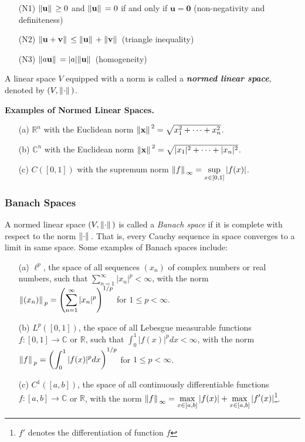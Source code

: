 \documentclass[12pt, a4paper]{article} %
\begin{document}
\begin{itemize}
\item[(N1)] $\norm*{\mathbf{u}}\geq 0$ and $\norm*{\mathbf{u}}=0$ if and only if $\mathbf{u}=\mathbf{0}$ (non-negativity and definiteness)
\item[(N2)] $\norm*{\mathbf{u}+\mathbf{v}}\leq \norm*{\mathbf{u}}+\norm*{\mathbf{v}}$ (triangle inequality)
\item[(N3)] $\norm*{a\mathbf{u}}=|a|\norm*{\mathbf{u}}$ (homogeneity)
\end{itemize}

A linear space $V$ equipped with a norm is called a \textit{\bf normed linear space}, denoted by $(V,\norm*{\cdot})$.


\textbf{Examples of Normed Linear Spaces.}

\begin{itemize}
\item[(a)] $\mathbb{R}^n$ with the Euclidean norm $\norm*{\mathbf{x}}^2 = \sqrt{x_1^2+\cdots+x_n^2}$.
\item[(b)] $\mathbb{C}^n$ with the Euclidean norm $\norm*{\mathbf{x}}^2 = \sqrt{|x_1|^2+\cdots+|x_n|^2}$.
\item[(c)] $C([0,1])$ with the supremum norm $\norm*{f}_{\infty} = \displaystyle \sup_{x\in[0,1]}|f(x)|$.
\end{itemize}

\subsubsection{Banach Spaces}
A normed linear space $(V,\norm*{\cdot})$ is called a \textit{Banach space} if it is complete with respect to the norm $\norm*{\cdot}$. That is, every Cauchy sequence in space converges to a limit in same space. Some examples of Banach spaces include:

\pagebreak

\vspace*{0.2cm}
\begin{itemize}
\item[(a)] $\ell^p$, the space of all sequences $(x_n)$ of complex numbers or real numbers, such that $\displaystyle \sum_{n=1}^{\infty}|x_n|^p<\infty$, with the norm $\norm*{(x_n)}_p = \left(\displaystyle \sum_{n=1}^{\infty}|x_n|^p \right)^{1/p}$ for $1\leq p<\infty$.
\item[(b)] $L^p([0,1])$, the space of all Lebesgue measurable functions $f:[0,1]\rightarrow \mathbb{C}$ or $\mathbb{R}$, such that $\displaystyle \int_0^1|f(x)|^p dx<\infty$, with the norm $\norm*{f}_p = \left(\displaystyle \int_0^1|f(x)|^p dx \right)^{1/p}$ for $1\leq p<\infty$.
\item[(c)] $C^1([a,b])$, the space of all continuously differentiable functions $f:[a,b]\rightarrow \mathbb{C}$ or $\mathbb{R}$, with the norm $\norm*{f}_{\infty} = \displaystyle \displaystyle \max_{x\in[a,b]}|f(x)| + \displaystyle \max_{x\in[a,b]}|f'(x)|$\footnote{$f'$ denotes the differentiation of function $f$}.
\end{itemize}
\end{document}
